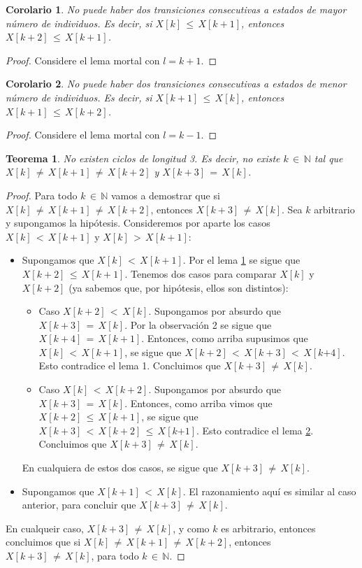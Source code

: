 \documentclass{article}
\newtheorem{teor}{Teorema}
\newtheorem{coro}{Corolario}
\begin{document}
\begin{coro}\label{lema1}
No puede haber dos transiciones consecutivas a estados de mayor número de individuos. Es decir, si $X[k]\,{\leq}\,X[k{+}1]$, entonces $X[k{+}2]\,{\leq}\, X[k{+}1]$.
\end{coro}
\begin{proof}
Considere el lema mortal con $l=k+1$.
\end{proof}

\begin{coro}\label{lema2}
No puede haber dos transiciones consecutivas a estados de menor número de individuos. Es decir, si $X[k{+}1]\,{\leq}\,X[k]$, entonces $X[k{+}1]\,{\leq}\, X[k{+}2]$.
\end{coro}
\begin{proof}
Considere el lema mortal con $l=k-1$.
\end{proof}

\begin{teor}
No existen ciclos de longitud 3. Es decir, no existe $k\,{\in}\,\mathbb{N}$ tal que $X[k]\,{\neq}\, X[k{+}1]\,{\neq}\, X[k{+}2]$ y $X[k{+}3]\,{=}\,X[k]$. 
\end{teor}
\begin{proof}
Para todo $k\,{\in}\,\mathbb{N}$ vamos a demostrar que si $X[k]\,{\neq}\, X[k{+}1]\,{\neq}\, X[k{+}2]$, entonces $X[k{+}3]\,{\neq}\,X[k]$. Sea $k$ arbitrario y supongamos la hipótesis. Consideremos por aparte los casos $X[k]\,{<}\, X[k{+}1]$ y $X[k]\,{>}\, X[k{+}1]$:
%
\begin{itemize}
\item Supongamos que $X[k]\,{<}\, X[k{+}1]$. Por el lema \ref{lema1} se sigue que $X[k{+}2]\,{\leq}\, X[k{+}1]$. Tenemos dos casos para comparar $X[k]$ y $X[k{+}2]$ (ya sabemos que, por hipótesis, ellos son distintos):
	\begin{itemize}
	\item Caso $X[k{+}2]\,{<}\,X[k]$. Supongamos por absurdo que $X[k{+}3]\,{=}\,X[k]$. Por la observación 2 se sigue que $X[k{+}4]\,{=}\,X[k{+}1]$. Entonces, como arriba supusimos que $X[k]\,{<}\, X[k{+}1]$, se sigue que $X[k{+}2]\,{<}\,X[k{+}3]\,{<}\,X[k{+4}]$. Esto contradice el lema 1. Concluimos que $X[k{+}3]\,{\neq}\,X[k]$.
	\item Caso $X[k]\,{<}\,X[k{+}2]$. Supongamos por absurdo que $X[k{+}3]\,{=}\,X[k]$. Entonces, como arriba vimos que $X[k{+}2]\,{\leq}\, X[k{+}1]$, se sigue que $X[k{+}3]\,{<}\,X[k{+}2]\,{\leq}\,X[k{+1}]$. Esto contradice el lema \ref{lema2}. Concluimos que $X[k{+}3]\,{\neq}\,X[k]$.
	\end{itemize}
	En cualquiera de estos dos casos, se sigue que $X[k{+}3]\,{\neq}\,X[k]$.

\item Supongamos que $X[k{+}1]\,{<}\, X[k]$. El razonamiento aquí es similar al caso anterior, para concluir que $X[k{+}3]\,{\neq}\,X[k]$.
\end{itemize}
En cualqueir caso, $X[k{+}3]\,{\neq}\,X[k]$, y como $k$ es arbitrario, entonces concluimos que si $X[k]\,{\neq}\, X[k{+}1]\,{\neq}\, X[k{+}2]$, entonces $X[k{+}3]\,{\neq}\,X[k]$, para todo $k\,{\in}\,\mathbb{N}$.
\end{proof}
\end{document}
